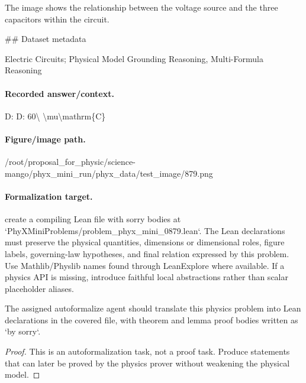 The image shows the relationship between the voltage source and the three capacitors within the circuit.

\#\# Dataset metadata

Electric Circuits; Physical Model Grounding Reasoning, Multi-Formula Reasoning

\paragraph{Recorded answer/context.}
D: D: 60\textbackslash{} \textbackslash{}mu\textbackslash{}mathrm\{C\}

\paragraph{Figure/image path.}
/root/proposal\_for\_physic/science-mango/phyx\_mini\_run/phyx\_data/test\_image/879.png

\paragraph{Formalization target.}
create a compiling Lean file with sorry bodies at `PhyXMiniProblems/problem\_phyx\_mini\_0879.lean`. The Lean declarations must preserve the physical quantities, dimensions or dimensional roles, figure labels, governing-law hypotheses, and final relation expressed by this problem.
Use Mathlib/Physlib names found through LeanExplore where available. If a physics API is missing, introduce faithful local abstractions rather than scalar placeholder aliases.

\begin{theorem}
\label{thm:physics:phyx_mini_0879:target}
The assigned autoformalize agent should translate this physics problem into Lean declarations in the covered file, with theorem and lemma proof bodies written as `by sorry`.
\end{theorem}
\begin{proof}
This is an autoformalization task, not a proof task. Produce statements that can later be proved by the physics prover without weakening the physical model.
\end{proof}

